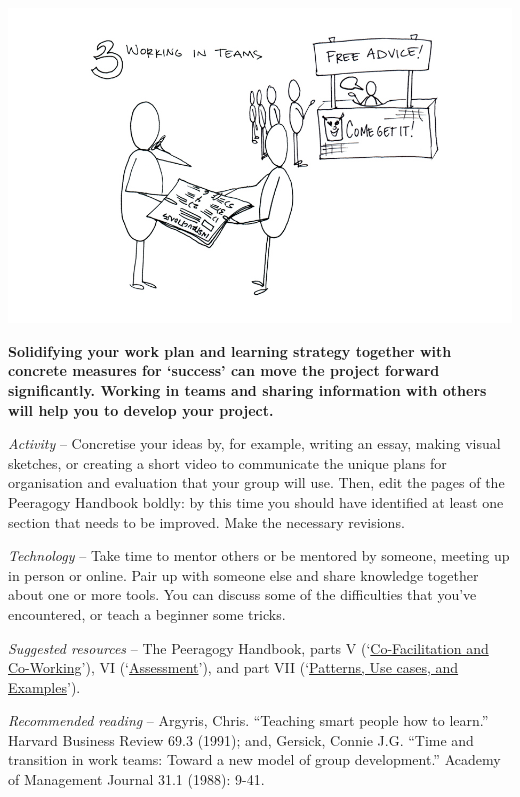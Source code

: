 \begin{center}
\includegraphics{./pictures/OpenBook-2-3.jpg}
\end{center}

\textbf{Solidifying your work plan and learning strategy together with
concrete measures for `success' can move the project forward
significantly. Working in teams and sharing information with others will
help you to develop your project.}

\emph{Activity} -- Concretise your ideas by, for example, writing an
essay, making visual sketches, or creating a short video to communicate
the unique plans for organisation and evaluation that your group will
use. Then, edit the pages of the Peeragogy Handbook boldly: by this time
you should have identified at least one section that needs to be
improved. Make the necessary revisions.

\emph{Technology} -- Take time to mentor others or be mentored by
someone, meeting up in person or online. Pair up with someone else and
share knowledge together about one or more tools. You can discuss some
of the difficulties that you've encountered, or teach a beginner some
tricks.

\emph{Suggested resources} -- The Peeragogy Handbook, parts V
(`\href{http://peeragogy.org/co-facilitation/}{Co-Facilitation and
Co-Working}'), VI
(`\href{http://peeragogy.org/assessment/}{Assessment}'), and part VII
(`\href{http://peeragogy.org/patterns-usecases/}{Patterns, Use cases,
and Examples}').

\emph{Recommended reading} -- Argyris, Chris. ``Teaching smart people
how to learn.'' Harvard Business Review 69.3 (1991); and, Gersick,
Connie J.G. ``Time and transition in work teams: Toward a new model of
group development.'' Academy of Management Journal 31.1 (1988): 9-41.

